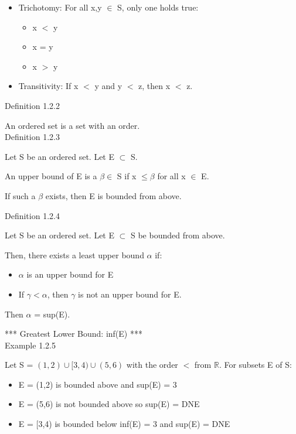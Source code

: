 \begin{itemize}[leftmargin=2cm]
	\item { \color{lblue} Trichotomy}: For all x,y $ \in $ S, only one holds true:
		\begin{itemize}[leftmargin=2cm]
			\item x $<$ y
			\item x = y
			\item x $>$ y
		\end{itemize}
	
	\item { \color{lblue} Transitivity}: If x $<$ y and y $<$ z, then x $<$ z.
\end{itemize}

{ \color{blue} Definition 1.2.2 }

\qquad An ordered set is a set with an order. \\

{ \color{blue} Definition 1.2.3 }

\qquad Let S be an ordered set. Let E $ \subset $ S.

\qquad An upper bound of E is a $ \beta \in $ S if x $ \leq \beta $ for all x $ \in $ E.

\qquad If such a $ \beta $ exists, then E is bounded from above. \\

\newpage

{ \color{blue} Definition 1.2.4 }

\qquad Let S be an ordered set. Let E $ \subset $ S be bounded from above.

\qquad Then, there exists a least upper bound $ \alpha $ if:

\begin{itemize}[leftmargin=2cm]
	\item $ \alpha $ is an upper bound for E
	
	\item If $ \gamma < \alpha $, then $ \gamma $ is not an upper bound for E.
\end{itemize}

\qquad Then $ \alpha $ = sup(E).

*** Greatest Lower Bound: inf(E) *** \\

{ \color{purple} Example 1.2.5 }

\qquad Let S = $ (1,2) \cup [3,4) \cup (5,6) $ with the order $ < $ from $ \mathbb{R} $.
For subsets E of S:

\begin{itemize}[leftmargin=2cm]
	\item E = (1,2) is bounded above and sup(E) = 3
	
	\item E = (5,6) is not bounded above so sup(E) = DNE
	
	\item E = [3,4) is bounded below inf(E) = 3 and sup(E) = DNE
\end{itemize}

